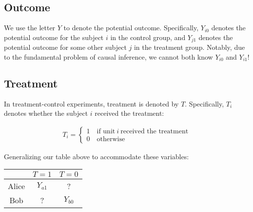 \documentclass{article}
\begin{document}
\subsection{Outcome}
We use the letter $Y$ to denote the potential outcome.
Specifically, $Y_{i0}$ denotes the potential outcome for the subject $i$ in the control group, and $Y_{j1}$ denotes the potential outcome for some other subject $j$ in the treatment group.
Notably, due to the fundamental problem of causal inference, we cannot both know $Y_{i0}$ and $Y_{i1}$!

\subsection{Treatment}
In treatment-control experiments, treatment is denoted by $T$.
Specifically, $T_i$ denotes whether the subject $i$ received the treatment:
\begin{center}
    \begin{gather*}
        T_i =
        \begin{cases}
            1 \quad \text{if unit} \ i \ \text{received the treatment} \\
            0 \quad \text{otherwise}
        \end{cases}
    \end{gather*}
\end{center}
Generalizing our table above to accommodate these variables:
\begin{center}
    \begin{tabular}{|c|c|c|}
         \hline
          & $T = 1$ & $T=0$ \\
         \hline
         Alice & $Y_{a1}$ & ? \\
         \hline
         Bob & ? & $Y_{b0}$ \\
         \hline
    \end{tabular}
\end{center}
\end{document}
